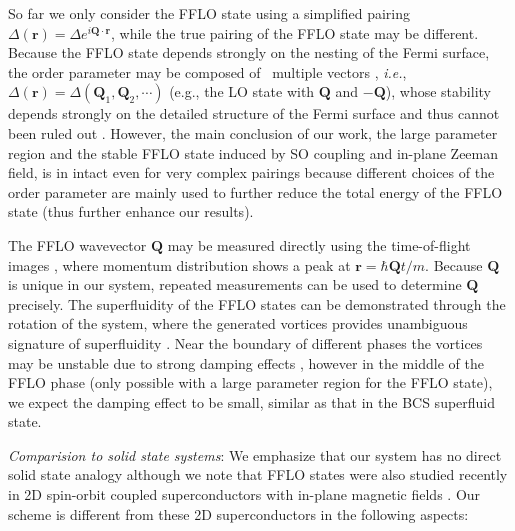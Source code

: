 \documentclass[prl,showpacs,twocolumn]{revtex4}
\begin{document}
So far we only consider the FFLO state using a simplified pairing $\Delta (%
\mathbf{r})=\Delta e^{i\mathbf{Q}\cdot \mathbf{r}}$, while the true pairing
of the FFLO state may be different. Because the FFLO state depends strongly
on the nesting of the Fermi surface, the order parameter may be composed of
\ multiple vectors \cite{Yuji,Bulaevskii}, \textit{i.e.}, $\Delta (\mathbf{r}%
)=\Delta (\mathbf{Q}_{1},\mathbf{Q}_{2},\cdots )$ (e.g., the LO state with $%
\mathbf{Q} $ and $-\mathbf{Q}$), whose stability depends strongly on the
detailed structure of the Fermi surface and thus cannot been ruled out \cite%
{Bulaevskii}. However, the main conclusion of our work, the large parameter
region and the stable FFLO state induced by SO coupling and in-plane Zeeman
field, is in intact even for very complex pairings because different choices
of the order parameter are mainly used to further reduce the total energy of
the FFLO state (thus further enhance our results).

The FFLO wavevector $\mathbf{Q}$ may be measured directly using the
time-of-flight images \cite{Koponen, Stein}, where momentum distribution
shows a peak at $\mathbf{r} = \hbar \mathbf{Q}t/m$. Because $\mathbf{Q}$ is
unique in our system, repeated measurements can be used to determine $%
\mathbf{Q}$ precisely. The superfluidity of the FFLO states can be
demonstrated through the rotation of the system, where the generated
vortices provides unambiguous signature of superfluidity \cite{Zwierlein052}%
. Near the boundary of different phases the vortices may be unstable due to
strong damping effects \cite{Zwierlein05}, however in the middle of the FFLO
phase (only possible with a large parameter region for the FFLO state), we
expect the damping effect to be small, similar as that in the BCS superfluid
state.

\textit{Comparision to solid state systems}: We emphasize that our system
has no direct solid state analogy although we note that FFLO states were
also studied recently in 2D spin-orbit coupled superconductors with in-plane
magnetic fields \cite{2DSC1,2DSC2,2DSC3}. Our scheme is different from these
2D superconductors in the following aspects:
\end{document}
